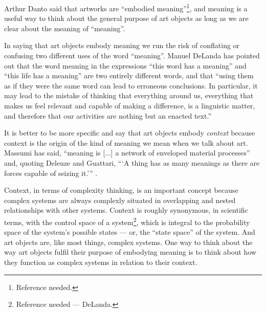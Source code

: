 \documentclass[letterpaper]{article}
\begin{document}

    Arthur Danto said that artworks are “embodied meaning”\footnote{
        Reference needed.
    }, and meaning is a useful way to think about the general purpose of art objects as long as we are clear about the meaning of “meaning”.
    
    In saying that art objects embody meaning we run the risk of conflating or confusing two different uses of the word “meaning”. Manuel DeLanda has pointed out that the word meaning in the expressions “this word has a meaning” and “this life has a meaning” are two entirely different words, and that “using them as if they were the same word can lead to erroneous conclusions. In particular, it may lead to the mistake of thinking that everything around us, everything that makes us feel relevant and capable of making a difference, is a linguistic matter, and therefore that our activities are nothing but an enacted text.” \citep[pp.40-41]{DeLandaCsltyAndMnng2018}
    
    It is better to be more specific and say that art objects embody \emph{context} because context is the origin of the kind of meaning we mean when we talk about art. Massumi has said, “meaning is [...] a network of enveloped material processes” and, quoting Deleuze and Guattari, “‘A thing has as many meanings as there are forces capable of seizing it.’” \citep[p.10]{MassumiAUsrsGdTCptlsmAndSchzphrn1992}.

    Context, in terms of complexity thinking, is an important concept because complex systems are always complexly situated in overlapping and nested relationships with other systems. Context is roughly synonymous, in scientific terms, with the control space of a system\footnote{
        Reference needed — DeLanda.
    }, which is integral to the probability space of the system's possible states — or, the “state space” of the system. And art objects are, like most things, complex systems. One way to think about the way art objects fulfil their purpose of embodying meaning is to think about how they function as complex systems in relation to their context.
    
\end{document}
